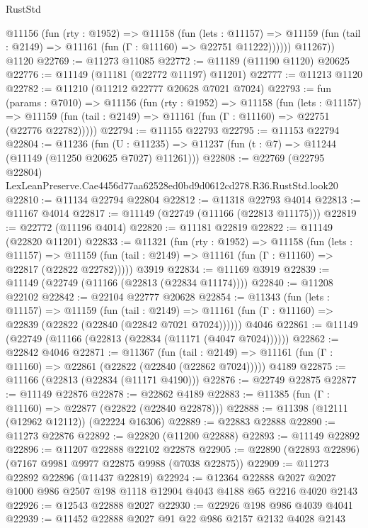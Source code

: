 \begin{lexlean}{RustStd}
\begin{coremodule}
          @11156
            (fun (rty : @1952) =>
            @11158
              (fun (lets : @11157) =>
              @11159 (fun (tail : @2149) => @11161 (fun (Γ : @11160) => @22751 @11222))))))
        @11267))
    @1120
@22769 := @11273 @11085
@22772 := @11189 (@11190 @1120) @20625
@22776 := @11149 (@11181 (@22772 @11197) @11201)
@22777 := @11213 @1120
@22782 := @11210 (@11212 @22777 @20628 @7021 @7024)
@22793 := fun (params : @7010) =>
  @11156
    (fun (rty : @1952) =>
    @11158
      (fun (lets : @11157) =>
      @11159 (fun (tail : @2149) => @11161 (fun (Γ : @11160) => @22751 (@22776 @22782)))))
@22794 := @11155 @22793
@22795 := @11153 @22794
@22804 := @11236
    (fun (U : @11235) => @11237 (fun (t : @7) => @11244 (@11149 (@11250 @20625 @7027) @11261)))
@22808 := @22769
    (@22795 @22804)
    LexLeanPreserve.Cae4456d77aa62528ed0bd9d0612cd278.R36.RustStd.look20
@22810 := @11134 @22794 @22804
@22812 := @11318 @22793 @4014
@22813 := @11167 @4014
@22817 := @11149 (@22749 (@11166 (@22813 @11175)))
@22819 := @22772 (@11196 @4014)
@22820 := @11181 @22819
@22822 := @11149 (@22820 @11201)
@22833 := @11321
    (fun (rty : @1952) =>
    @11158
      (fun (lets : @11157) =>
      @11159 (fun (tail : @2149) => @11161 (fun (Γ : @11160) => @22817 (@22822 @22782)))))
    @3919
@22834 := @11169 @3919
@22839 := @11149 (@22749 (@11166 (@22813 (@22834 @11174))))
@22840 := @11208 @22102
@22842 := @22104 @22777 @20628
@22854 := @11343
    (fun (lets : @11157) =>
    @11159
      (fun (tail : @2149) =>
      @11161 (fun (Γ : @11160) => @22839 (@22822 (@22840 (@22842 @7021 @7024))))))
    @4046
@22861 := @11149 (@22749 (@11166 (@22813 (@22834 (@11171 (@4047 @7024))))))
@22862 := @22842 @4046
@22871 := @11367
    (fun (tail : @2149) => @11161 (fun (Γ : @11160) => @22861 (@22822 (@22840 (@22862 @7024)))))
    @4189
@22875 := @11166 (@22813 (@22834 (@11171 @4190)))
@22876 := @22749 @22875
@22877 := @11149 @22876
@22878 := @22862 @4189
@22883 := @11385 (fun (Γ : @11160) => @22877 (@22822 (@22840 @22878)))
@22888 := @11398 (@12111 (@12962 @12112)) (@22224 @16306)
@22889 := @22883 @22888
@22890 := @11273 @22876
@22892 := @22820 (@11200 @22888)
@22893 := @11149 @22892
@22896 := @11207 @22888 @22102 @22878
@22905 := @22890 (@22893 @22896) (@7167 @9981 @9977 @22875 @9988 (@7038 @22875))
@22909 := @11273 @22892 @22896 (@11437 @22819)
@22924 := @12364
    @22888
    @2027
    @2027
    @1000
    @986
    @2507
    @198
    @1118
    @12904
    @4043
    @4188
    @65
    @2216
    @4020
    @2143
@22926 := @12543 @22888 @2027
@22930 := @22926 @198 @986 @4039 @4041
@22939 := @11452 @22888 @2027 @91 @22 @986 @2157 @2132 @4028 @2143

\end{coremodule}
\end{lexlean}
